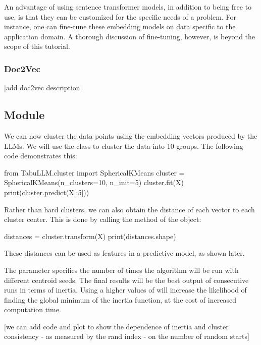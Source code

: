 \documentclass[article]{jss}
\begin{document}
An advantage of using sentence transformer models, in addition to being free to use, is that they can be customized for the specific needs of a problem. For instance, one can fine-tune these embedding models on data specific to the application domain. A thorough discussion of fine-tuning, however, is beyond the scope of this tutorial.

\subsubsection{Doc2Vec}\label{subsubsec:using-embed-doc2vec}

[add doc2vec description]

\subsection[cluster Module]{ Module}\label{subsec:using-cluster}

We can now cluster the data points using the embedding vectors produced by the LLMs. We will use the  class to cluster the data into 10 groups. The following code demonstrates this:
\begin{pyblock}
from TabuLLM.cluster import SphericalKMeans
cluster = SphericalKMeans(n_clusters=10, n_init=5)
cluster.fit(X)
print(cluster.predict(X[:5]))
\end{pyblock}
\stdoutpythontex %

Rather than hard clusters, we can also obtain the distance of each vector to each cluster center. This is done by calling the  method of the  object:
\begin{pyblock}
distances = cluster.transform(X)
print(distances.shape)
\end{pyblock}
\stdoutpythontex %

These distances can be used as features in a predictive model, as shown later.

The parameter  specifies the number of times the algorithm will be run with different centroid seeds. The final results will be the best output of  consecutive runs in terms of inertia. Using a higher values of  will increase the likelihood of finding the global minimum of the inertia function, at the cost of increased computation time.

[we can add code and plot to show the dependence of inertia and cluster consistency - as measured by the rand index - on the number of random starts]
\end{document}

